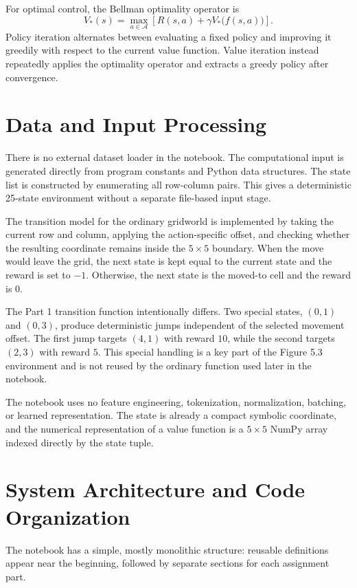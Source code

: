 \documentclass[11pt,a4paper]{article}
\newcommand{\code}[1]{\texttt{\detokenize{#1}}}
\begin{document}
For optimal control, the Bellman optimality operator is
\begin{equation}
V_*(s)
=\max_{a\in\mathcal{A}}
\left[R(s,a)+\gamma V_*\bigl(f(s,a)\bigr)\right].
\end{equation}
Policy iteration alternates between evaluating a fixed policy and improving it greedily with respect to the current value function. Value iteration instead repeatedly applies the optimality operator and extracts a greedy policy after convergence.

\section{Data and Input Processing}
There is no external dataset loader in the notebook. The computational input is generated directly from program constants and Python data structures. The state list is constructed by enumerating all row-column pairs. This gives a deterministic 25-state environment without a separate file-based input stage.

The transition model for the ordinary gridworld is implemented by taking the current row and column, applying the action-specific offset, and checking whether the resulting coordinate remains inside the \(5\times5\) boundary. When the move would leave the grid, the next state is kept equal to the current state and the reward is set to \(-1\). Otherwise, the next state is the moved-to cell and the reward is \(0\).

The Part 1 transition function intentionally differs. Two special states, \((0,1)\) and \((0,3)\), produce deterministic jumps independent of the selected movement offset. The first jump targets \((4,1)\) with reward \(10\), while the second targets \((2,3)\) with reward \(5\). This special handling is a key part of the Figure 5.3 environment and is not reused by the ordinary \code{transition} function used later in the notebook.

The notebook uses no feature engineering, tokenization, normalization, batching, or learned representation. The state is already a compact symbolic coordinate, and the numerical representation of a value function is a \(5\times5\) NumPy array indexed directly by the state tuple.

\section{System Architecture and Code Organization}
The notebook has a simple, mostly monolithic structure: reusable definitions appear near the beginning, followed by separate sections for each assignment part.
\end{document}
